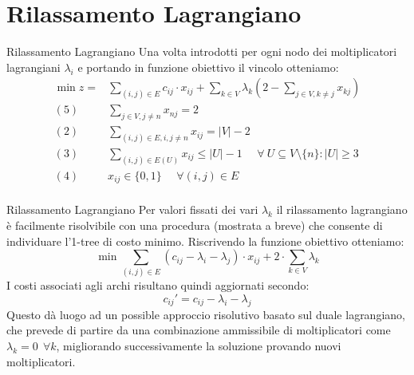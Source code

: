 \documentclass[10pt]{beamer}
\begin{document}
    \section{Rilassamento Lagrangiano}\label{sec:rilassamento-lagrangiano}
    \begin{frame}{Rilassamento Lagrangiano}
        Una volta introdotti per ogni nodo dei moltiplicatori lagrangiani $\lambda_i$ e portando in funzione obiettivo il vincolo otteniamo:
        \begin{equation*}
            \begin{split}
                \min z = & \sum_{(i,j) \in E} c_{ij} \cdot x_{ij} + \sum_{k\in V} \lambda_k (2 - \sum_{j\in V, k\neq j} x_{kj})\\
                (5)\:\:\:\:\:\: & \sum_{j \in V, j \neq n} x_{nj} = 2 \\
                (2) \:\:\:\:\:\: & \sum_{(i,j)\in E, i, j \neq n} x_{ij} = |V|-2 \\
                (3) \:\:\:\:\:\: & \sum_{(i,j) \in E(U)} x_{ij} \leq |U| - 1 \:\:\:\:\:\: \forall\: U \subseteq V\setminus\{n\} : |U| \geq 3 \\
                (4) \:\:\:\:\:\: & x_{ij} \in \{0,1\} \:\:\:\:\:\: \forall (i,j) \in E\\
            \end{split}
        \end{equation*}
    \end{frame}

    \begin{frame}{Rilassamento Lagrangiano}
        Per valori fissati dei vari $\lambda_k$ il rilassamento lagrangiano è facilmente risolvibile con una procedura (mostrata a breve) che consente di individuare l'1-tree di costo minimo.
        \newline
        \newline
        Riscrivendo la funzione obiettivo otteniamo:
        \begin{equation*}
            \min \sum_{(i,j)\in E} ( c_{ij} - \lambda_i - \lambda_j) \cdot x_{ij} + 2 \cdot \sum_{k \in V} \lambda_k
        \end{equation*}
        I costi associati agli archi risultano quindi aggiornati secondo:
        \begin{equation*}
            c_{ij}' = c_{ij} - \lambda_i - \lambda_j
        \end{equation*}
        Questo dà luogo ad un possible approccio risolutivo basato sul duale lagrangiano, che prevede di partire da una combinazione ammissibile di moltiplicatori come $\lambda_k = 0\:\: \forall k$, migliorando successivamente la soluzione provando nuovi moltiplicatori.
    \end{frame}
\end{document}
